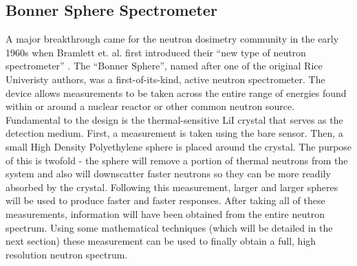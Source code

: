 \subsection{Bonner Sphere Spectrometer}
A major breakthrough came for the neutron dosimetry community in the early 1960s when Bramlett et. al. first introduced their ``new type of neutron spectrometer'' \cite{bramblett1960new}.
The ``Bonner Sphere'', named after one of the original Rice Univeristy authors, was a first-of-its-kind, active neutron spectrometer.
The device allows measurements to be taken across the entire range of energies found within or around a nuclear reactor or other common neutron source.
Fundamental to the design is the thermal-sensitive LiI crystal that serves as the detection medium.
First, a measurement is taken using the bare sensor.
Then, a small High Density Polyethylene sphere is placed around the crystal.
The purpose of this is twofold - the sphere will remove a portion of thermal neutrons from the system and also will downscatter faster neutrons so they can be more readily absorbed by the crystal.
Following this measurement, larger and larger spheres will be used to produce faster and faster responses.
After taking all of these measurements, information will have been obtained from the entire neutron spectrum.
Using some mathematical techniques (which will be detailed in the next section) these measurement can be used to finally obtain a full, high resolution neutron spectrum.

